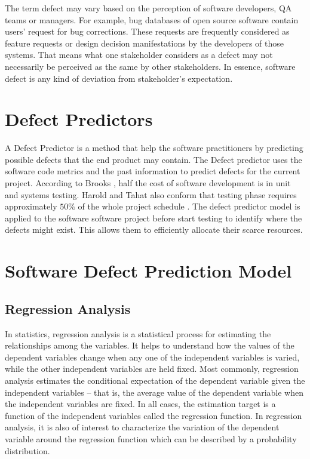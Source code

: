 \documentclass[12pt]{report}
\begin{document}
The term defect may vary based on the perception of software developers, QA teams or managers. For example, bug databases of open source software contain users' request for bug corrections. These requests are frequently considered as feature requests or design decision manifestations by the developers of those systems. That means what one stakeholder considers as a defect may not necessarily be perceived as the same by other stakeholders. In essence, software defect is any kind of deviation from stakeholder's expectation.

\section{Defect Predictors}
A Defect Predictor is a method that help the software practitioners by predicting possible defects that the end product may contain. The Defect predictor uses the software code metrics and the past information to predict defects for the current project. According to Brooks \cite{brooks1995mythical}, half the cost of software development is in unit and systems testing. Harold and Tahat also conform that testing phase requires approximately $50\%$ of the whole project schedule \cite{harrold2000testing,tahat2001requirement}. The defect predictor model is applied to the software software project before start testing to identify where the defects might exist. This allows them to efficiently allocate their scarce resources. 

\section{Software Defect Prediction Model}
\subsection{Regression Analysis}
In statistics, regression analysis is a statistical process for estimating the relationships among the variables. It helps to understand how the values of the dependent variables change when any one of the independent variables is varied, while the other independent variables are held fixed. Most commonly, regression analysis estimates the conditional expectation of the dependent variable given the independent variables – that is, the average value of the dependent variable when the independent variables are fixed. In all cases, the estimation target is a function of the independent variables called the regression function. In regression analysis, it is also of interest to characterize the variation of the dependent variable around the regression function which can be described by a probability distribution.
\end{document}
